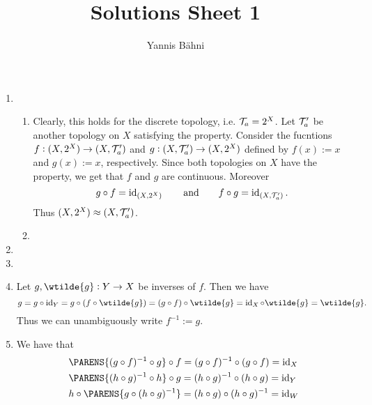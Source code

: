 

\title{Solutions Sheet 1}
\author{Yannis B\"{a}hni}
\address[Yannis B\"{a}hni]{University of Zurich, R\"{a}mistrasse 71, 8006 Zurich}


\maketitle
\thispagestyle{fancy}

\begin{enumerate}[label = \textbf{Exercise \arabic*.},wide = 0pt, itemsep=1.5ex]
	\item ~
		\begin{enumerate}[label = \textup{(}\alph*\textup{)}]
			\item Clearly, this holds for the discrete topology, i.e. $\mathcal{T}_a = 2^X$. Let $\mathcal{T}_a'$ be another topology on $X$ satisfying the property. Consider the fucntions $f : (X,2^X) \to (X,\mathcal{T}_a')$ and $g : (X,\mathcal{T}_a') \to (X,2^X)$ defined by $f(x) := x$ and $g(x) := x$, respectively. Since both topologies on $X$ have the property, we get that $f$ and $g$ are continuous. Moreover
				\begin{equation*}
					g \circ f = \operatorname{id}_{(X,2^X)} \qquad \text{and} \qquad f \circ g = \operatorname{id}_{(X,\mathcal{T}_a')}.
				\end{equation*}
				Thus $(X,2^X) \approx (X,\mathcal{T}_a')$.
			\item
		\end{enumerate}
	\item 
	\item
	\item Let $g,\wtilde{g} : Y \to X$ be inverses of $f$. Then we have
		\begin{equation*}
			g = g \circ \id_Y = g \circ (f \circ \wtilde{g}) = (g \circ f) \circ \wtilde{g} = \id_X \circ \wtilde{g} = \wtilde{g}.
		\end{equation*}
		Thus we can unambiguously write $f^{-1} := g$.
	\item We have that 
		\begin{align*}
			&\PARENS{(g \circ f)^{-1} \circ g} \circ f = (g \circ f)^{-1} \circ (g \circ f) = \id_X\\
			&\PARENS{(h \circ g)^{-1} \circ h} \circ g = (h \circ g)^{-1} \circ (h \circ g) = \id_Y\\
			&h \circ \PARENS{g \circ (h \circ g)^{-1}} = (h \circ g) \circ (h \circ g)^{-1} = \id_W
		\end{align*}

\end{enumerate}
